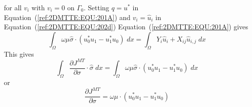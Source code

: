 for all $v_i$ with $v_i=0$ on $\Gamma_{0}$. Setting $q=u^*$ in Equation~(\ref{ref:2DMTTE:EQU:201A}) and 
$v_i=\hat{u}_i$ in Equation~(\ref{ref:2DMTTE:EQU:202d}) Equation~(\ref{ref:2DMTTE:EQU:201A}) gives
\begin{equation}\label{ref:2DMTTE:EQU:290}
\int_{\Omega} \omega \mu \hat{\sigma} \cdot ( u^*_0 u_1 - u^*_1 u_0) \; dx
= \int_{\Omega}  Y_i \hat{u}_i + X_{ij}  \hat{u}_{i,j} \; dx  
\end{equation}
This gives 
\begin{equation}\label{ref:2DMTTE:EQU:300}
\int_{\Omega}   \frac{\partial J^{MT}}{\partial \sigma} \cdot \hat{\sigma} \; dx  =
\int_{\Omega} \omega \mu \hat{\sigma} \cdot ( u^*_0 u_1 - u^*_1 u_0) \; dx
\end{equation}
or 
\begin{equation}\label{ref:2DMTTE:EQU:301}
\frac{\partial J^{MT}}{\partial \sigma} = \omega \mu \cdot ( u^*_0 u_1 - u^*_1 u_0)
\end{equation}

